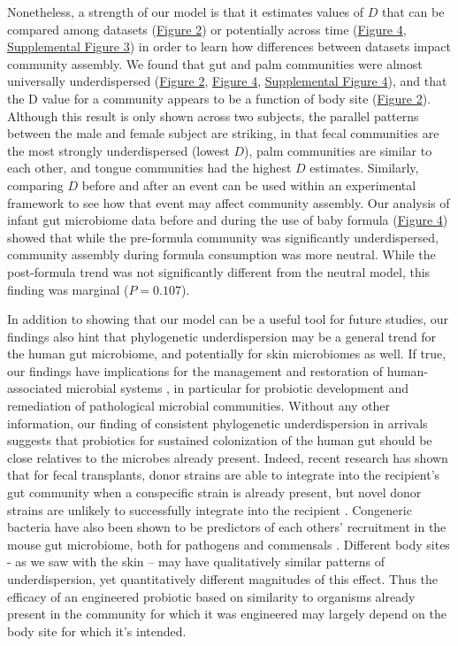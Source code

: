 \documentclass{article}
\begin{document}
\par
Nonetheless, a strength of our model is that it estimates values of \(D\) that can be compared among datasets (\hyperref[sec:figure2]{Figure 2}) or potentially across time (\hyperref[sec:figure4]{Figure 4}, \hyperref[sec:figureS3]{Supplemental Figure 3}) in order to learn how differences between datasets impact community assembly. We found that gut and palm communities were almost universally underdispersed (\hyperref[sec:figure2]{Figure 2}, \hyperref[sec:figure4]{Figure 4}, \hyperref[sec:figureS4]{Supplemental Figure 4}), and that the D value for a community appears to be a function of body site (\hyperref[sec:figure2]{Figure 2}). Although this result is only shown across two subjects, the parallel patterns between the male and female subject are striking, in that fecal communities are the most strongly underdispersed (lowest \(D\)), palm communities are similar to each other, and tongue communities had the highest \(D\) estimates.  Similarly, comparing \(D\) before and after an event can be used within an experimental framework to see how that event may affect community assembly. Our analysis of infant gut microbiome data \cite{Koenig2011} before and during the use of baby formula (\hyperref[sec:figure4]{Figure 4}) showed that while the pre-formula community was significantly underdispersed, community assembly during formula consumption was more neutral. While the post-formula trend was not significantly different from the neutral model, this finding was marginal (\(P = 0.107\)). 
\par
In addition to showing that our model can be a useful tool for future studies, our findings also hint that phylogenetic underdispersion may be a general trend for the human gut microbiome, and potentially for skin microbiomes as well. If true, our findings have implications for the management and restoration of human-associated microbial systems \cite{Shooner2015}, in particular for probiotic development and remediation of pathological microbial communities. Without any other information, our finding of consistent phylogenetic underdispersion in arrivals suggests that probiotics for sustained colonization of the human gut should be close relatives to the microbes already present. Indeed, recent research has shown that for fecal transplants, donor strains are able to integrate into the recipient's gut community when a conspecific strain is already present, but novel donor strains are unlikely to successfully integrate into the recipient \cite{Li2016}. Congeneric bacteria have also been shown to be predictors of each others' recruitment in the mouse gut microbiome, both for pathogens and commensals \cite{Stecher2010}. Different body sites - as we saw with the skin – may have qualitatively similar patterns of underdispersion, yet quantitatively different magnitudes of this effect. Thus the efficacy of an engineered probiotic based on similarity to organisms already present in the community for which it was engineered may largely depend on the body site for which it's intended.
\end{document}
